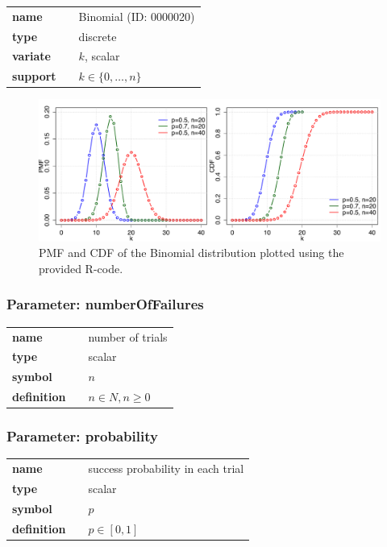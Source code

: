   \bigskip 

\begin{tabular}{p{2cm}cl}
\textbf{name} & & Binomial (ID: 0000020)\\ 
 
\textbf{type} & & discrete \\ 

\textbf{variate} & & $k$, scalar \\ 

\textbf{support} & & $k \in \{0,\dots,n\}$
\end{tabular}

\begin{figure}[htb!]
\centering
  \includegraphics[width=140mm]{pics/Binomial_pmf_cdf.pdf}
 \caption{PMF and CDF of the Binomial distribution plotted using the provided R-code.}
 \label{fig:Bionomial_pmf_cdf}
\end{figure}

\subsubsection*{Parameter: numberOfFailures}

\noindent\begin{tabular}{p{2cm}cl}
\textbf{name} & & number of trials \\
\textbf{type} & & scalar \\
\textbf{symbol} & & $n$  \\
\textbf{definition} & & $n \in N, n \ge 0$
\end{tabular}
\subsubsection*{Parameter: probability}

\noindent\begin{tabular}{p{2cm}cl}
\textbf{name} & & success probability in each trial \\
\textbf{type} & & scalar \\
\textbf{symbol} & & $p$  \\
\textbf{definition} & & $p \in [0,1]$
\end{tabular}
